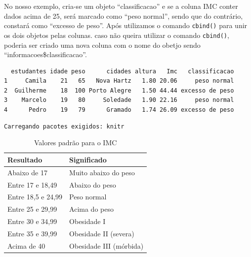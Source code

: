 \documentclass[12pt,brazil,oneside]{book}
\newenvironment{Shaded}{\begin{snugshade}}{\end{snugshade}}
\newcommand{\CommentTok}[1]{\textcolor[rgb]{0.56,0.35,0.01}{\textit{#1}}}
\newcommand{\DecValTok}[1]{\textcolor[rgb]{0.00,0.00,0.81}{#1}}
\newcommand{\KeywordTok}[1]{\textcolor[rgb]{0.13,0.29,0.53}{\textbf{#1}}}
\newcommand{\NormalTok}[1]{#1}
\newcommand{\OperatorTok}[1]{\textcolor[rgb]{0.81,0.36,0.00}{\textbf{#1}}}
\newcommand{\StringTok}[1]{\textcolor[rgb]{0.31,0.60,0.02}{#1}}
\begin{document}
No nosso exemplo, cria-se um objeto ``classificacao'' e se a coluna IMC conter dados acima de 25, será marcado como ``peso normal'', sendo que do contrário, constará como ``excesso de peso''. Após utilizamos o comando \texttt{cbind()} para unir os dois objetos pelas colunas. caso não queira utilizar o comando \texttt{cbind()}, poderia ser criado uma nova coluna com o nome do obetjo sendo ``informacoes\$classificacao''.

\begin{Shaded}
\end{Shaded}

\begin{verbatim}
  estudantes idade peso      cidades altura   Imc   classificacao
1     Camila    21   65   Nova Hartz   1.80 20.06     peso normal
2  Guilherme    18  100 Porto Alegre   1.50 44.44 excesso de peso
3    Marcelo    19   80     Soledade   1.90 22.16     peso normal
4      Pedro    19   79      Gramado   1.74 26.09 excesso de peso
\end{verbatim}

\begin{verbatim}
Carregando pacotes exigidos: knitr
\end{verbatim}

\begin{table}

\caption{\label{tab:imct}Valores padrão para o IMC}
\centering
\begin{tabular}[t]{l|l}
\hline
Resultado & Significado\\
\hline
Abaixo de 17 & Muito abaixo do peso\\
\hline
Entre 17 e 18,49 & Abaixo do peso\\
\hline
Entre 18,5 e 24,99 & Peso normal\\
\hline
Entre 25 e 29,99 & Acima do peso\\
\hline
Entre 30 e 34,99 & Obesidade I\\
\hline
Entre 35 e 39,99 & Obesidade II (severa)\\
\hline
Acima de 40 & Obesidade III (mórbida)\\
\hline
\end{tabular}
\end{table}
\end{document}
